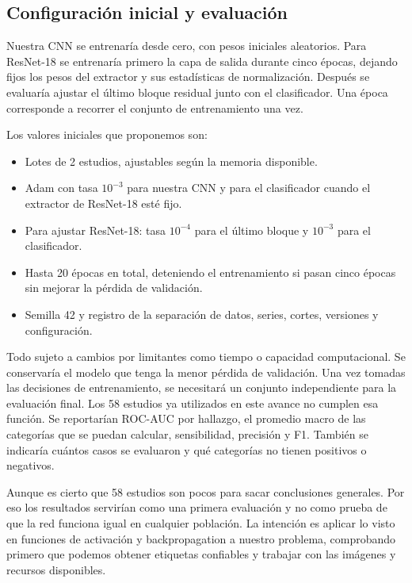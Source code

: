 \documentclass[eng]{ajceam-class}
\begin{document}
\subsection{Configuración inicial y evaluación}

Nuestra CNN se entrenaría desde cero, con pesos iniciales aleatorios. Para ResNet-18 se entrenaría primero la capa de salida durante cinco épocas, dejando fijos los pesos del extractor y sus estadísticas de normalización. Después se evaluaría ajustar el último bloque residual junto con el clasificador. Una época corresponde a recorrer el conjunto de entrenamiento una vez.

Los valores iniciales que proponemos son:
\begin{itemize}
    \item Lotes de 2 estudios, ajustables según la memoria disponible.
    \item Adam con tasa $10^{-3}$ para nuestra CNN y para el clasificador cuando el extractor de ResNet-18 esté fijo.
    \item Para ajustar ResNet-18: tasa $10^{-4}$ para el último bloque y $10^{-3}$ para el clasificador.
    \item Hasta 20 épocas en total, deteniendo el entrenamiento si pasan cinco épocas sin mejorar la pérdida de validación.
    \item Semilla 42 y registro de la separación de datos, series, cortes, versiones y configuración.
\end{itemize}

Todo sujeto a cambios por limitantes como tiempo o capacidad computacional. Se conservaría el modelo que tenga la menor pérdida de validación. Una vez tomadas las decisiones de entrenamiento, se necesitará un conjunto independiente para la evaluación final. Los 58 estudios ya utilizados en este avance no cumplen esa función. Se reportarían ROC-AUC por hallazgo, el promedio macro de las categorías que se puedan calcular, sensibilidad, precisión y F1. También se indicaría cuántos casos se evaluaron y qué categorías no tienen positivos o negativos.

Aunque es cierto que 58 estudios son pocos para sacar conclusiones generales. Por eso los resultados servirían como una primera evaluación y no como prueba de que la red funciona igual en cualquier población. La intención es aplicar lo visto en funciones de activación y backpropagation a nuestro problema, comprobando primero que podemos obtener etiquetas confiables y trabajar con las imágenes y recursos disponibles.
\end{document}
